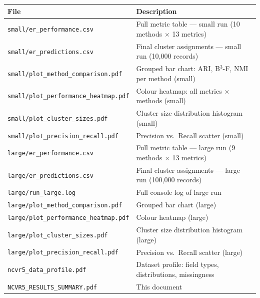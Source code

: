 \documentclass[11pt, a4paper]{article}
\begin{document}
\begin{table}[h!]
\centering
\begin{tabular}{ll}
\toprule
\textbf{File} & \textbf{Description} \\
\midrule
\texttt{small/er\_performance.csv}        & Full metric table --- small run (10 methods $\times$ 13 metrics) \\
\texttt{small/er\_predictions.csv}        & Final cluster assignments --- small run (10,000 records) \\
\texttt{small/plot\_method\_comparison.pdf} & Grouped bar chart: ARI, B$^3$-F, NMI per method (small) \\
\texttt{small/plot\_performance\_heatmap.pdf} & Colour heatmap: all metrics $\times$ methods (small) \\
\texttt{small/plot\_cluster\_sizes.pdf}   & Cluster size distribution histogram (small) \\
\texttt{small/plot\_precision\_recall.pdf} & Precision vs.\ Recall scatter (small) \\
\texttt{large/er\_performance.csv}        & Full metric table --- large run (9 methods $\times$ 13 metrics) \\
\texttt{large/er\_predictions.csv}        & Final cluster assignments --- large run (100,000 records) \\
\texttt{large/run\_large.log}             & Full console log of large run \\
\texttt{large/plot\_method\_comparison.pdf} & Grouped bar chart (large) \\
\texttt{large/plot\_performance\_heatmap.pdf} & Colour heatmap (large) \\
\texttt{large/plot\_cluster\_sizes.pdf}   & Cluster size distribution histogram (large) \\
\texttt{large/plot\_precision\_recall.pdf} & Precision vs.\ Recall scatter (large) \\
\texttt{ncvr5\_data\_profile.pdf}         & Dataset profile: field types, distributions, missingness \\
\texttt{NCVR5\_RESULTS\_SUMMARY.pdf}      & This document \\
\bottomrule
\end{tabular}
\end{table}
\end{document}
